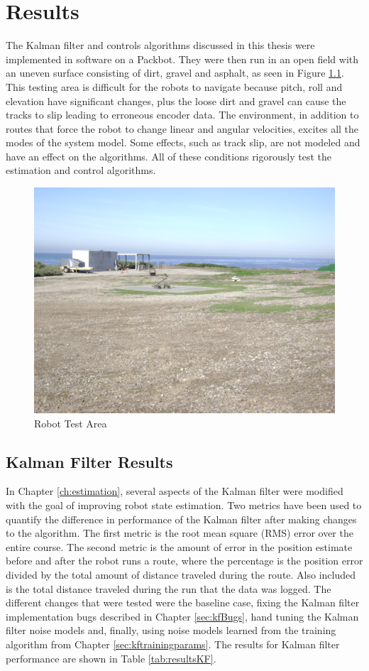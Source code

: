 \chapter{Results}
\label{ch:results}
The Kalman filter and controls algorithms discussed in this thesis were implemented in software on a Packbot. They were then run in an open field with an uneven surface consisting of dirt, gravel and asphalt, as seen in Figure \ref{fig:resultsTestArea}. This testing area is difficult for the robots to navigate because pitch, roll and elevation have significant changes, plus the loose dirt and gravel can cause the tracks to slip leading to erroneous encoder data. The environment, in addition to routes that force the robot to change linear and angular velocities, excites all the modes of the system model. Some effects, such as track slip, are not modeled and have an effect on the algorithms. All of these conditions rigorously test the estimation and control algorithms.

\begin{figure}[ht!]
	\centering
	\includegraphics[width=.75\textwidth]{images/flightFieldTestArea}
	\caption{Robot Test Area}
	\label{fig:resultsTestArea}
\end{figure}

\section{Kalman Filter Results}
\label{sec:kfResults}
In Chapter \ref{ch:estimation}, several aspects of the Kalman filter were modified with the goal of improving robot state estimation. Two metrics have been used to quantify the difference in performance of the Kalman filter after making changes to the algorithm. The first metric is the root mean square (RMS) error over the entire course. The second metric is the amount of error in the position estimate before and after the robot runs a route, where the percentage is the position error divided by the total amount of distance traveled during the route. Also included is the total distance traveled during the run that the data was logged. The different changes that were tested were the baseline case, fixing the Kalman filter implementation bugs described in Chapter \ref{sec:kfBugs}, hand tuning the Kalman filter noise models and, finally, using noise models learned from the training algorithm from Chapter \ref{sec:kftrainingparams}. The results for Kalman filter performance are shown in Table \ref{tab:resultsKF}.

